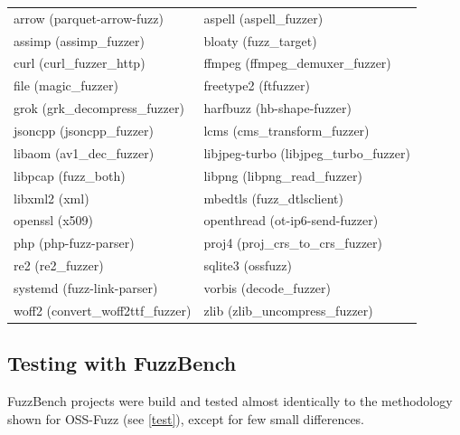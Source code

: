 \noindent
\begin{tabularx}{\textwidth}{
    @{\hspace{2em}}%
    >{\leavevmode\llap{\textbullet~}\raggedright\rule{0pt}{4ex}}%
    X%
    @{\quad\hspace{1em}}%
    >{\leavevmode\llap{\textbullet~}\raggedright\arraybackslash}%
    X%
    @{}%
  }
  arrow (parquet-arrow-fuzz) & aspell (aspell\_fuzzer) \\
  assimp (assimp\_fuzzer) & bloaty (fuzz\_target) \\
  curl (curl\_fuzzer\_http) & ffmpeg (ffmpeg\_demuxer\_fuzzer) \\
  file (magic\_fuzzer) & freetype2 (ftfuzzer) \\
  grok (grk\_decompress\_fuzzer) & harfbuzz (hb-shape-fuzzer) \\
  jsoncpp (jsoncpp\_fuzzer) & lcms (cms\_transform\_fuzzer) \\
  libaom (av1\_dec\_fuzzer) & libjpeg-turbo (libjpeg\_turbo\_fuzzer) \\
  libpcap (fuzz\_both) & libpng (libpng\_read\_fuzzer) \\
  libxml2 (xml) & mbedtls (fuzz\_dtlsclient) \\
  openssl (x509) & openthread (ot-ip6-send-fuzzer) \\
  php (php-fuzz-parser) & proj4 (proj\_crs\_to\_crs\_fuzzer) \\
  re2 (re2\_fuzzer) & sqlite3 (ossfuzz) \\
  systemd (fuzz-link-parser) & vorbis (decode\_fuzzer) \\
  woff2 (convert\_woff2ttf\_fuzzer) & zlib (zlib\_uncompress\_fuzzer)  
\end{tabularx}





\newpage
\subsection{Testing with FuzzBench}
FuzzBench projects were build and tested almost identically to the methodology shown for OSS-Fuzz (see \ref{test}), except for few small differences.


